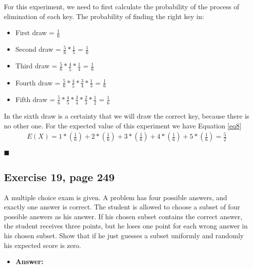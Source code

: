 \documentclass{article}
\begin{document}
For this experiment, we need to first calculate the probability of the process of elimination of each key. The probability of finding the right key in:

\begin{itemize}
\item First draw = $\frac{1}{6}$
\item Second draw = $\frac{5}{6} * \frac{1}{5}$ = $\frac{1}{6}$
\item Third draw = $\frac{5}{6} *\frac{4}{5} *\frac{1}{4}$ = $\frac{1}{6}$
\item Fourth draw = $\frac{5}{6}*\frac{4}{5}*\frac{3}{4}*\frac{1}{3}$ = $\frac{1}{6}$
\item Fifth draw = $\frac{5}{6}*\frac{4}{5}*\frac{3}{4}*\frac{2}{3} * \frac{1}{2} $ = $\frac{1}{6}$
\end{itemize}

In the sixth draw is a certainty that we will draw the correct key, because there is no other one. For the expected value of this experiment we have Equation \ref{eq8}\\

 \begin{eqnarray}
\label{eq8}
E(X) = 1* \left(\frac{1}{6}\right) +2* \left(\frac{1}{6}\right) +3* \left(\frac{1}{6}\right) +4* \left(\frac{1}{6}\right) +5* \left(\frac{1}{6}\right) = \frac{5}{2}
\end{eqnarray}


\begin{flushright}
$\blacksquare$
\end{flushright}

\subsection{Exercise 19, page 249}

A multiple choice exam is given. A problem has four possible answers, and exactly one answer is correct. The student is allowed to choose a subset of four possible answers as his answer. If his chosen subset contains the correct answer, the student receives three points, but he loses one point for each wrong answer in his chosen subset. Show that if he just guesses a subset uniformly and randomly his expected score is zero.\\

\begin{itemize}
\item \textbf{Answer:}
\end{itemize}
\end{document}
